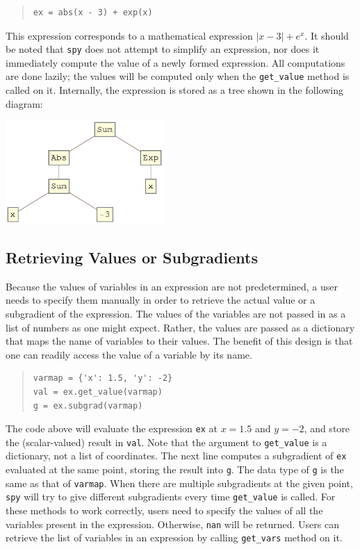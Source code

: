 \documentclass[12pt]{article}
\begin{document}
\begin{quote}
\begin{verbatim}
ex = abs(x - 3) + exp(x)
\end{verbatim}
\end{quote}

\noindent This expression corresponds to a mathematical expression
$|x-3|+e^x$. It should be noted that \verb'spy' does not attempt to
simplify an expression, nor does it immediately compute the value of
a newly formed expression. All computations are done lazily; the
values will be computed only when the \verb'get_value' method is called on
it. Internally, the expression is stored as a tree shown in the following diagram:

\begin{center}
\includegraphics[width=0.45\textwidth]{expr}
\end{center}

\subsection{Retrieving Values or Subgradients}
Because the values of variables in an expression are not predetermined, a user needs to specify them manually in order to retrieve the actual value or a subgradient of the expression. The values of the variables are not passed in as a list of numbers as one might expect. Rather, the values are passed as a dictionary that maps the name of variables to their values. The benefit of this design is that one can readily access the value of a variable by its name.

\begin{quote}
\begin{verbatim}
varmap = {'x': 1.5, 'y': -2}
val = ex.get_value(varmap)
g = ex.subgrad(varmap)
\end{verbatim}
\end{quote}

\noindent The code above will evaluate the expression \verb'ex' at $x=1.5$ and $y=-2$, and store the (scalar-valued) result in \verb'val'. Note that the argument to \verb'get_value' is a dictionary, not a list of coordinates. The next line computes a subgradient of \verb'ex' evaluated at the same point, storing the result into \verb'g'. The data type of \verb'g' is the same as that of \verb'varmap'. When there are multiple subgradients at the given point, \verb'spy' will try to give different subgradients every time \verb'get_value' is called. For these methods to work correctly, users need to specify the values of all the variables present in the expression. Otherwise, \verb'nan' will be returned. Users can retrieve the list of variables in an expression by calling \verb'get_vars' method on it.
\end{document}
